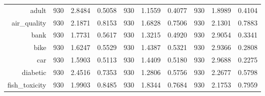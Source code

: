 \begin{table}[htbp]
{\begin{tabular}{rccccccccc}
                  adult                               & 930                                & 2.8484                                                                    & 0.5058          & 930            & \cellcolor[rgb]{ .776,  .937,  .808}\textcolor[rgb]{ 0,  .38,  0}{1.1559}          & 0.4077          & 930            & 1.8989          & 0.4104          \\
                  air\_quality                        & 930                                & 2.1871                                                                    & 0.8153          & 930            & \cellcolor[rgb]{ .776,  .937,  .808}\textcolor[rgb]{ 0,  .38,  0}{1.6828}          & 0.7506          & 930            & 2.1301          & 0.7883          \\
                  bank                                & 930                                & 1.7731                                                                    & 0.5617          & 930            & \cellcolor[rgb]{ .776,  .937,  .808}\textcolor[rgb]{ 0,  .38,  0}{1.3215}          & 0.4920          & 930            & 2.9054          & 0.3341          \\
                  bike                                & 930                                & 1.6247                                                                    & 0.5529          & 930            & \cellcolor[rgb]{ .776,  .937,  .808}\textcolor[rgb]{ 0,  .38,  0}{1.4387}          & 0.5321          & 930            & 2.9366          & 0.2808          \\
                  car                                 & 930                                & 1.5903                                                                    & 0.5113          & 930            & \cellcolor[rgb]{ .776,  .937,  .808}\textcolor[rgb]{ 0,  .38,  0}{1.4409}          & 0.5180          & 930            & 2.9688          & 0.2275          \\
                  diabetic                            & 930                                & 2.4516                                                                    & 0.7353          & 930            & \cellcolor[rgb]{ .776,  .937,  .808}\textcolor[rgb]{ 0,  .38,  0}{1.2806}          & 0.5756          & 930            & 2.2677          & 0.5798          \\
                  fish\_toxicity                      & 930                                & 1.9903                                                                    & 0.8485          & 930            & \cellcolor[rgb]{ .776,  .937,  .808}\textcolor[rgb]{ 0,  .38,  0}{1.8344}          & 0.7684          & 930            & 2.1753          & 0.7959          \\

\end{tabular}}
\end{table}
